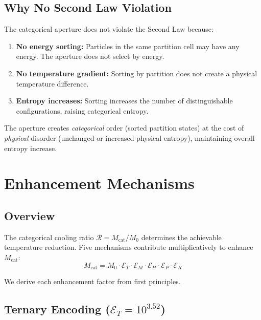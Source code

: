 \documentclass[twocolumn,10pt,twoside]{article}
\newcommand{\Enh}{\mathcal{E}}
\newcommand{\Mcat}{M_{\mathrm{cat}}}
\begin{document}
\subsection{Why No Second Law Violation}

The categorical aperture does not violate the Second Law because:

\begin{enumerate}
    \item \textbf{No energy sorting:} Particles in the same partition cell may have any energy. The aperture does not select by energy.

    \item \textbf{No temperature gradient:} Sorting by partition does not create a physical temperature difference.

    \item \textbf{Entropy increases:} Sorting increases the number of distinguishable configurations, raising categorical entropy.
\end{enumerate}

The aperture creates \textit{categorical} order (sorted partition states) at the cost of \textit{physical} disorder (unchanged or increased physical entropy), maintaining overall entropy increase.

\section{Enhancement Mechanisms}

\subsection{Overview}

The categorical cooling ratio $\mathcal{R} = \Mcat/M_0$ determines the achievable temperature reduction. Five mechanisms contribute multiplicatively to enhance $\Mcat$:
\begin{equation}
\Mcat = M_0 \cdot \Enh_T \cdot \Enh_M \cdot \Enh_H \cdot \Enh_P \cdot \Enh_R
\label{eq:total_enhancement}
\end{equation}

We derive each enhancement factor from first principles.

\subsection{Ternary Encoding ($\Enh_T = 10^{3.52}$)}
\end{document}

